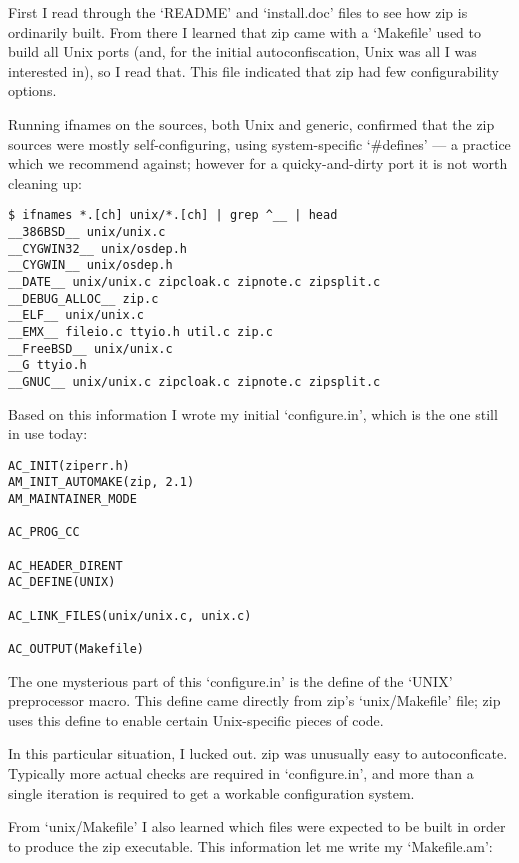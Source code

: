 First I read through the `README' and `install.doc' files to see how zip is ordinarily built. From there I learned that zip came with a `Makefile' used to build all Unix ports (and, for the initial autoconfiscation, Unix was all I was interested in), so I read that. This file indicated that zip had few configurability options.

Running ifnames on the sources, both Unix and generic, confirmed that the 
zip sources were mostly self-configuring, using system-specific `\#defines' ---
a practice which we recommend against; however for a quicky-and-dirty port 
it is not worth cleaning up: 

\begin{Verbatim}[frame=single]
$ ifnames *.[ch] unix/*.[ch] | grep ^__ | head
__386BSD__ unix/unix.c
__CYGWIN32__ unix/osdep.h
__CYGWIN__ unix/osdep.h
__DATE__ unix/unix.c zipcloak.c zipnote.c zipsplit.c
__DEBUG_ALLOC__ zip.c
__ELF__ unix/unix.c
__EMX__ fileio.c ttyio.h util.c zip.c
__FreeBSD__ unix/unix.c
__G ttyio.h
__GNUC__ unix/unix.c zipcloak.c zipnote.c zipsplit.c
\end{Verbatim}

Based on this information I wrote my initial `configure.in', which is the one still in use today:

\begin{Verbatim}[frame=single]
AC_INIT(ziperr.h)
AM_INIT_AUTOMAKE(zip, 2.1)
AM_MAINTAINER_MODE

AC_PROG_CC

AC_HEADER_DIRENT
AC_DEFINE(UNIX)

AC_LINK_FILES(unix/unix.c, unix.c)

AC_OUTPUT(Makefile)
\end{Verbatim}

The one mysterious part of this `configure.in' is the define of the `UNIX' preprocessor macro. This define came directly from zip's `unix/Makefile' file; zip uses this define to enable certain Unix-specific pieces of code.

In this particular situation, I lucked out. zip was unusually easy to autoconficate. Typically more actual checks are required in `configure.in', and more than a single iteration is required to get a workable configuration system.

From `unix/Makefile' I also learned which files were expected to be built in order to produce the zip executable. This information let me write my `Makefile.am': 

